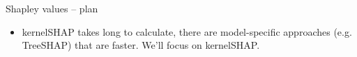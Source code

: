 \documentclass[aspectratio=169,handout]{beamer} %
\begin{document}
\begin{frame}{Shapley values -- plan}
\footnotesize
\begin{itemize}
        \item kernelSHAP takes long to calculate, there are model-specific approaches (e.g. TreeSHAP) that are faster. We'll focus on kernelSHAP.
    \end{itemize}


\end{frame}
\end{document}
